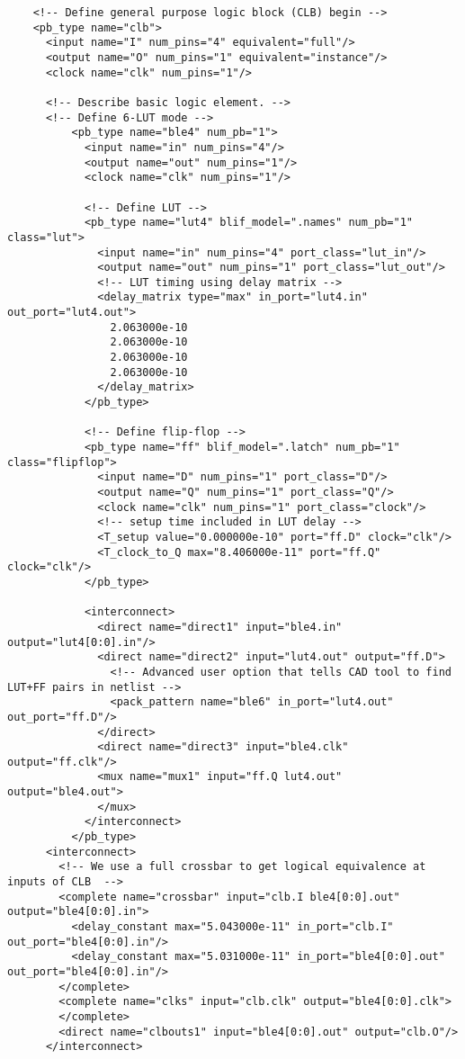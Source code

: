 \begin{lstlisting}
    <!-- Define general purpose logic block (CLB) begin -->
    <pb_type name="clb">
      <input name="I" num_pins="4" equivalent="full"/>
      <output name="O" num_pins="1" equivalent="instance"/>
      <clock name="clk" num_pins="1"/>

      <!-- Describe basic logic element. -->
      <!-- Define 6-LUT mode -->
          <pb_type name="ble4" num_pb="1">
            <input name="in" num_pins="4"/>
            <output name="out" num_pins="1"/>
            <clock name="clk" num_pins="1"/> 

            <!-- Define LUT -->
            <pb_type name="lut4" blif_model=".names" num_pb="1" class="lut">
              <input name="in" num_pins="4" port_class="lut_in"/>
              <output name="out" num_pins="1" port_class="lut_out"/>
              <!-- LUT timing using delay matrix -->
              <delay_matrix type="max" in_port="lut4.in" out_port="lut4.out">
                2.063000e-10
                2.063000e-10
                2.063000e-10
                2.063000e-10
              </delay_matrix>
            </pb_type>

            <!-- Define flip-flop -->
            <pb_type name="ff" blif_model=".latch" num_pb="1" class="flipflop">
              <input name="D" num_pins="1" port_class="D"/>
              <output name="Q" num_pins="1" port_class="Q"/>
              <clock name="clk" num_pins="1" port_class="clock"/>
			  <!-- setup time included in LUT delay -->
              <T_setup value="0.000000e-10" port="ff.D" clock="clk"/>
              <T_clock_to_Q max="8.406000e-11" port="ff.Q" clock="clk"/>
            </pb_type>

            <interconnect>
              <direct name="direct1" input="ble4.in" output="lut4[0:0].in"/>
              <direct name="direct2" input="lut4.out" output="ff.D">
                <!-- Advanced user option that tells CAD tool to find LUT+FF pairs in netlist -->
                <pack_pattern name="ble6" in_port="lut4.out" out_port="ff.D"/>
              </direct>
              <direct name="direct3" input="ble4.clk" output="ff.clk"/>                    
              <mux name="mux1" input="ff.Q lut4.out" output="ble4.out">
              </mux>
            </interconnect>
          </pb_type>
      <interconnect>
        <!-- We use a full crossbar to get logical equivalence at inputs of CLB  -->
        <complete name="crossbar" input="clb.I ble4[0:0].out" output="ble4[0:0].in">
          <delay_constant max="5.043000e-11" in_port="clb.I" out_port="ble4[0:0].in"/>
          <delay_constant max="5.031000e-11" in_port="ble4[0:0].out" out_port="ble4[0:0].in"/>
        </complete>
        <complete name="clks" input="clb.clk" output="ble4[0:0].clk">
        </complete>
        <direct name="clbouts1" input="ble4[0:0].out" output="clb.O"/>
      </interconnect>


\end{lstlisting}
